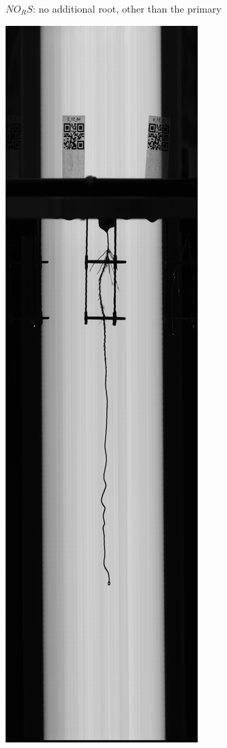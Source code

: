 \begin{figure}
\begin{subfigure}[b]{.13\textwidth}
  \caption{$NO_RS$: no additional root, other than the primary}
  \label{fig:NO_RS}
\end{subfigure}
%
\begin{subfigure}[b]{.13\textwidth}
  \centering
  \includegraphics[width=\linewidth]{figures/NO_LS.jpg}

\end{subfigure}
\end{figure}
